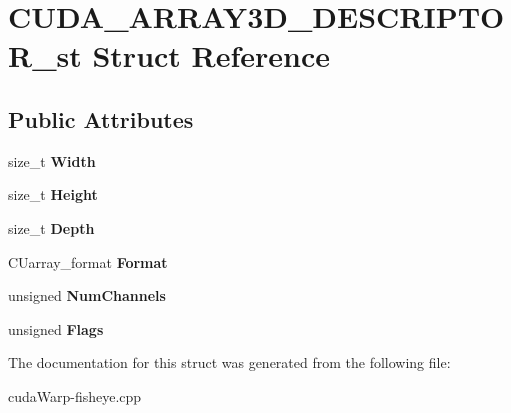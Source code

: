 \hypertarget{structCUDA__ARRAY3D__DESCRIPTOR__st}{}\section{C\+U\+D\+A\+\_\+\+A\+R\+R\+A\+Y3\+D\+\_\+\+D\+E\+S\+C\+R\+I\+P\+T\+O\+R\+\_\+st Struct Reference}
\label{structCUDA__ARRAY3D__DESCRIPTOR__st}
\subsection*{Public Attributes}
\begin{DoxyCompactItemize}
\item 
size\+\_\+t {\bfseries Width}\hypertarget{structCUDA__ARRAY3D__DESCRIPTOR__st_a536bbde6dce857e3594e197255aefdb7}{}\label{structCUDA__ARRAY3D__DESCRIPTOR__st_a536bbde6dce857e3594e197255aefdb7}

\item 
size\+\_\+t {\bfseries Height}\hypertarget{structCUDA__ARRAY3D__DESCRIPTOR__st_a248b0ec8033863cb2f89caba9fbaca47}{}\label{structCUDA__ARRAY3D__DESCRIPTOR__st_a248b0ec8033863cb2f89caba9fbaca47}

\item 
size\+\_\+t {\bfseries Depth}\hypertarget{structCUDA__ARRAY3D__DESCRIPTOR__st_ae619e5247969949d81e718596ec42209}{}\label{structCUDA__ARRAY3D__DESCRIPTOR__st_ae619e5247969949d81e718596ec42209}

\item 
C\+Uarray\+\_\+format {\bfseries Format}\hypertarget{structCUDA__ARRAY3D__DESCRIPTOR__st_a4edbba06d9449d1f507d8caf7068278b}{}\label{structCUDA__ARRAY3D__DESCRIPTOR__st_a4edbba06d9449d1f507d8caf7068278b}

\item 
unsigned {\bfseries Num\+Channels}\hypertarget{structCUDA__ARRAY3D__DESCRIPTOR__st_ac78f5310eb8350092e931f2acbce816a}{}\label{structCUDA__ARRAY3D__DESCRIPTOR__st_ac78f5310eb8350092e931f2acbce816a}

\item 
unsigned {\bfseries Flags}\hypertarget{structCUDA__ARRAY3D__DESCRIPTOR__st_a5d507fbd7d98ed6a7e4fb6137619c643}{}\label{structCUDA__ARRAY3D__DESCRIPTOR__st_a5d507fbd7d98ed6a7e4fb6137619c643}

\end{DoxyCompactItemize}


The documentation for this struct was generated from the following file\+:\begin{DoxyCompactItemize}
\item 
cuda\+Warp-\/fisheye.\+cpp\end{DoxyCompactItemize}
